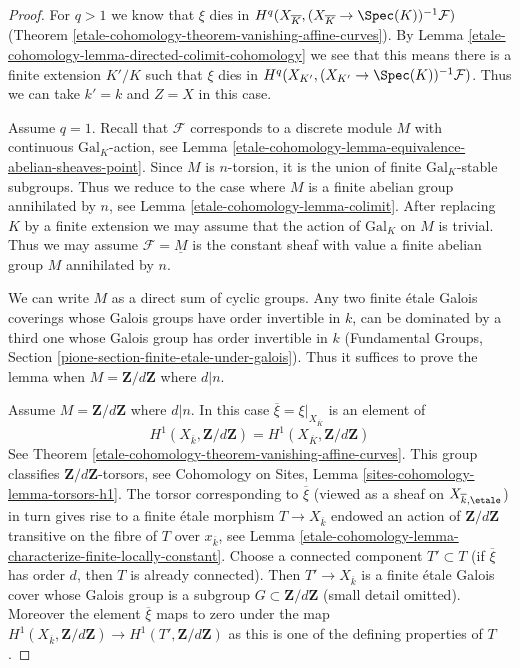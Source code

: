 \begin{proof}
For $q > 1$ we know that $\xi$ dies in
$H^q(X_{\overline{K}}, (X_{\overline{K}} \to \Spec(K))^{-1}\mathcal{F})$
(Theorem \ref{etale-cohomology-theorem-vanishing-affine-curves}).
By Lemma \ref{etale-cohomology-lemma-directed-colimit-cohomology} we see that
this means there is a finite extension $K'/K$ such that
$\xi$ dies in $H^q(X_{K'}, (X_{K'} \to \Spec(K))^{-1}\mathcal{F})$.
Thus we can take $k' = k$ and $Z = X$ in this case.

\medskip\noindent
Assume $q = 1$. Recall that $\mathcal{F}$ corresponds to a
discrete module $M$ with continuous $\text{Gal}_K$-action, see
Lemma \ref{etale-cohomology-lemma-equivalence-abelian-sheaves-point}.
Since $M$ is $n$-torsion, it is the union of finite
$\text{Gal}_K$-stable subgroups. Thus
we reduce to the case where $M$ is a finite abelian group annihilated by $n$,
see Lemma \ref{etale-cohomology-lemma-colimit}. After replacing $K$ by a finite extension
we may assume that the action of $\text{Gal}_K$ on $M$ is trivial.
Thus we may assume $\mathcal{F} = \underline{M}$ is the constant
sheaf with value a finite abelian group $M$ annihilated by $n$.

\medskip\noindent
We can write $M$ as a direct sum of cyclic groups.
Any two finite \'etale Galois coverings whose Galois groups
have order invertible in $k$, can be dominated by a third one whose
Galois group has order invertible in $k$
(Fundamental Groups, Section \ref{pione-section-finite-etale-under-galois}).
Thus it suffices to prove the lemma when
$M = \mathbf{Z}/d\mathbf{Z}$ where $d | n$.

\medskip\noindent
Assume $M = \mathbf{Z}/d\mathbf{Z}$ where $d | n$.
In this case $\overline{\xi} = \xi|_{X_{\overline{K}}}$ is an element of
$$
H^1(X_{\overline{k}}, \mathbf{Z}/d\mathbf{Z}) =
H^1(X_{\overline{K}}, \mathbf{Z}/d\mathbf{Z})
$$
See Theorem \ref{etale-cohomology-theorem-vanishing-affine-curves}.
This group classifies $\mathbf{Z}/d\mathbf{Z}$-torsors, see
Cohomology on Sites, Lemma \ref{sites-cohomology-lemma-torsors-h1}.
The torsor corresponding to $\overline{\xi}$ (viewed as a sheaf on
$X_{\overline{k}, \etale}$) in turn gives rise to a finite \'etale morphism
$T \to X_{\overline{k}}$ endowed an action of $\mathbf{Z}/d\mathbf{Z}$
transitive on the fibre of $T$ over $x_{\overline{k}}$, see
Lemma \ref{etale-cohomology-lemma-characterize-finite-locally-constant}.
Choose a connected component $T' \subset T$ (if $\overline{\xi}$ has
order $d$, then $T$ is already connected).
Then $T' \to X_{\overline{k}}$ is a finite \'etale Galois
cover whose Galois group is a subgroup $G \subset \mathbf{Z}/d\mathbf{Z}$
(small detail omitted). Moreover the element $\overline{\xi}$ maps to zero
under the map $H^1(X_{\overline{k}}, \mathbf{Z}/d\mathbf{Z}) \to
H^1(T', \mathbf{Z}/d\mathbf{Z})$ as this is one
of the defining properties of $T$.


\end{proof}
